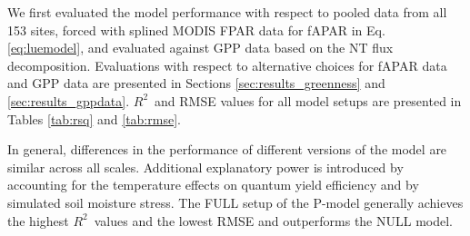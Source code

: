 \documentclass{myreport}
\newcommand{\rsq}{$R^2$}
\begin{document}
We first evaluated the model performance with respect to pooled data from all 153 sites, forced with splined MODIS FPAR data for fAPAR in Eq. \ref{eq:luemodel}, and evaluated against GPP data based on the NT flux decomposition. Evaluations with respect to alternative choices for fAPAR data and GPP data are presented in Sections \ref{sec:results_greenness} and \ref{sec:results_gppdata}. \rsq\ and RMSE values for all model setups are presented in Tables \ref{tab:rsq} and \ref{tab:rmse}.

In general, differences in the performance of different versions of the model are similar across all scales. Additional explanatory power is introduced by accounting for the temperature effects on quantum yield efficiency and by simulated soil moisture stress. The FULL setup of the P-model generally achieves the highest \rsq\ values and the lowest RMSE and outperforms the NULL model.


\end{document}
